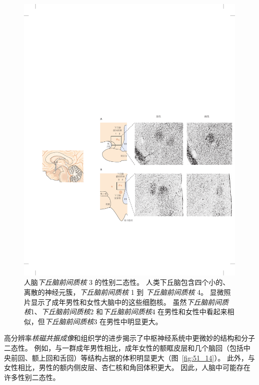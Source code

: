 \begin{figure}[htbp]
	\centering
	\includegraphics[width=1.0\linewidth]{chap51/fig_51_13}
	\caption{人脑\textit{下丘脑前间质核} 3 的性别二态性。
		人类下丘脑包含四个小的、离散的神经元簇，\textit{下丘脑前间质核} 1 到 \textit{下丘脑前间质核} 4。
		显微照片显示了成年男性和女性大脑中的这些细胞核。
		虽然\textit{下丘脑前间质核}1、\textit{下丘脑前间质核}2 和\textit{下丘脑前间质核}4 在男性和女性中看起来相似，但\textit{下丘脑前间质核}3 在男性中明显更大。\cite{gorski1988hormone} }
	\label{fig:51_13}
\end{figure}


高分辨率\textit{核磁共振成像}和组织学的进步揭示了中枢神经系统中更微妙的结构和分子二态性。
例如，与一群成年男性相比，成年女性的额眶皮层和几个脑回（包括中央前回、额上回和舌回）等结构占据的体积明显更大（图~\ref{fig:51_14}）。
此外，与女性相比，男性的额内侧皮层、杏仁核和角回体积更大。
因此，人脑中可能存在许多性别二态性。



